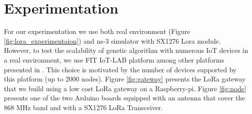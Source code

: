 \section{Experimentation} \label{sec:Experimentation}

For our experimentation we use both real environment (Figure \ref{fig:lora_experimentaion}) and ns-3 simulator with SX1276 Lora module.
However,
	to test the scalability of genetic algorithm with numerous IoT devices in a real environment,
	we use FIT IoT-LAB platform among other platforms presented in \cite{tonneau_how_2015}.
This choice is motivated by the number of devices supported by this platform (up to 2000 nodes).
Figure \ref{fig:gateway} presents the LoRa gateway that we build using a low cost LoRa gateway \cite{lowcostloragateway} on a Raspberry-pi.
Figure \ref{fig:node}  presents one of the two Arduino boards equipped with an antenna that cover the 868 MHz band and with a SX1276 LoRa Transceiver.






